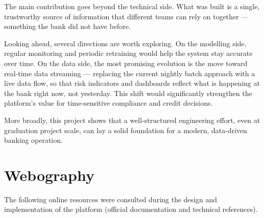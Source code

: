 \documentclass[a4paper, oneside, 12pt, final]{extreport}
\begin{document}
The main contribution goes beyond the technical side. What was built is a single,
trustworthy source of information that different teams can rely on together ---
something the bank did not have before.

Looking ahead, several directions are worth exploring. On the modelling side, regular
monitoring and periodic retraining would help the system stay accurate over time.
On the data side, the most promising evolution is the move toward real-time data
streaming --- replacing the current nightly batch approach with a live data flow,
so that risk indicators and dashboards reflect what is happening at the bank right now,
not yesterday. This shift would significantly strengthen the platform's value for
time-sensitive compliance and credit decisions.

More broadly, this project shows that a well-structured engineering effort, even at
graduation project scale, can lay a solid foundation for a modern, data-driven banking
operation.


\newpage
\appendix
{}






%

\renewcommand{\bibname}{References}


\cleardoublepage

\chapter*{Webography}
%

The following online resources were consulted during the design and implementation of the
platform (official documentation and technical references).
\end{document}
